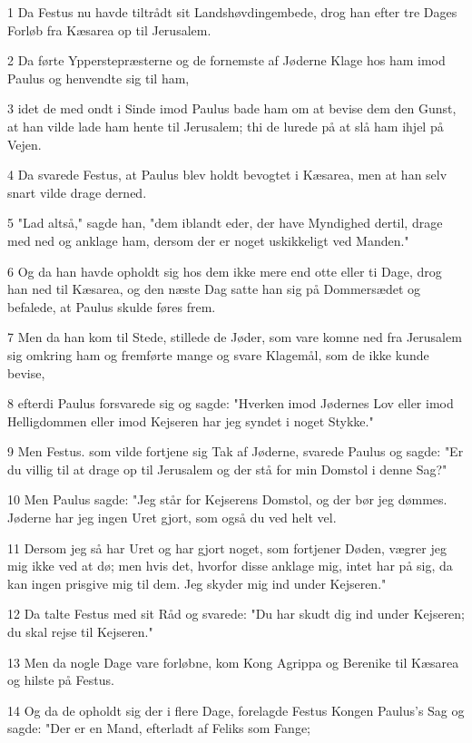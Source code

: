 \par 1 Da Festus nu havde tiltrådt sit Landshøvdingembede, drog han efter tre Dages Forløb fra Kæsarea op til Jerusalem.
\par 2 Da førte Ypperstepræsterne og de fornemste af Jøderne Klage hos ham imod Paulus og henvendte sig til ham,
\par 3 idet de med ondt i Sinde imod Paulus bade ham om at bevise dem den Gunst, at han vilde lade ham hente til Jerusalem; thi de lurede på at slå ham ihjel på Vejen.
\par 4 Da svarede Festus, at Paulus blev holdt bevogtet i Kæsarea, men at han selv snart vilde drage derned.
\par 5 "Lad altså," sagde han, "dem iblandt eder, der have Myndighed dertil, drage med ned og anklage ham, dersom der er noget uskikkeligt ved Manden."
\par 6 Og da han havde opholdt sig hos dem ikke mere end otte eller ti Dage, drog han ned til Kæsarea, og den næste Dag satte han sig på Dommersædet og befalede, at Paulus skulde føres frem.
\par 7 Men da han kom til Stede, stillede de Jøder, som vare komne ned fra Jerusalem sig omkring ham og fremførte mange og svare Klagemål, som de ikke kunde bevise,
\par 8 efterdi Paulus forsvarede sig og sagde: "Hverken imod Jødernes Lov eller imod Helligdommen eller imod Kejseren har jeg syndet i noget Stykke."
\par 9 Men Festus. som vilde fortjene sig Tak af Jøderne, svarede Paulus og sagde: "Er du villig til at drage op til Jerusalem og der stå for min Domstol i denne Sag?"
\par 10 Men Paulus sagde: "Jeg står for Kejserens Domstol, og der bør jeg dømmes. Jøderne har jeg ingen Uret gjort, som også du ved helt vel.
\par 11 Dersom jeg så har Uret og har gjort noget, som fortjener Døden, vægrer jeg mig ikke ved at dø; men hvis det, hvorfor disse anklage mig, intet har på sig, da kan ingen prisgive mig til dem. Jeg skyder mig ind under Kejseren."
\par 12 Da talte Festus med sit Råd og svarede: "Du har skudt dig ind under Kejseren; du skal rejse til Kejseren."
\par 13 Men da nogle Dage vare forløbne, kom Kong Agrippa og Berenike til Kæsarea og hilste på Festus.
\par 14 Og da de opholdt sig der i flere Dage, forelagde Festus Kongen Paulus's Sag og sagde: "Der er en Mand, efterladt af Feliks som Fange;
